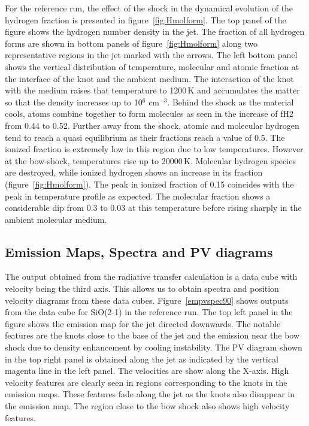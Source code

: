 \documentclass[useAMS,usenatbib]{mn2e}
\begin{document}
For the reference run, the effect of the shock in the dynamical evolution of
the hydrogen fraction is presented in figure~\ref{fig:Hmolform}. The top
panel of the figure shows the hydrogen number density in the jet. 
The fraction of all hydrogen forms are shown in bottom
panels of figure~\ref{fig:Hmolform} along two representative regions in
the jet marked with the arrows. The left bottom panel shows the
vertical distribution of temperature, molecular and atomic fraction at the
interface of the knot and the ambient medium. The interaction of the
knot with the medium raises that temperature to 1200\,K and
accumulates the matter so that the density increases up to
10$^{6}$ cm$^{-3}$. Behind the shock as the material cools, atoms
combine together to form molecules as seen in the increase of fH2 from
0.44 to 0.52. Further away from the
shock, atomic and molecular hydrogen tend to reach a quasi equilibrium as their
fractions reach a value of 0.5. The ionized fraction is
extremely low in this region due to low temperatures. However at the
bow-shock, temperatures rise up to 20000\,K. Molecular
hydrogen species are destroyed, while ionized hydrogen shows an
increase in its fraction 
(figure~\ref{fig:Hmolform}). The peak in ionized fraction of 0.15
coincides with the peak in temperature profile as expected. The
molecular fraction shows a considerable dip from 0.3 to 0.03 at 
this temperature before rising sharply in the ambient molecular
medium. 
%

\subsection{Emission Maps, Spectra and PV diagrams}
\label{ssec:emspecpv}
The output obtained from the radiative transfer calculation is a data
cube with velocity being the third axis. This allows us to obtain
spectra and position velocity diagrams from these data cubes. 
Figure~\ref{empvspec90} shows outputs from the data
cube for SiO(2-1) in the reference run. 
The top left panel in the figure shows the emission map for the jet
directed downwards. The notable features are the knots close to the
base of the jet and the emission near the bow shock due to density
enhancement by cooling instability. The PV diagram shown in the top
right panel is obtained along the jet as indicated by the vertical magenta
line in the left panel. The velocities are show along the X-axis. High velocity features
are clearly seen in regions corresponding to the knots in the emission
maps. These features fade along the jet as the knots also disappear in
the emission map. The region close to the bow shock also shows high
velocity features.
%
\end{document}
